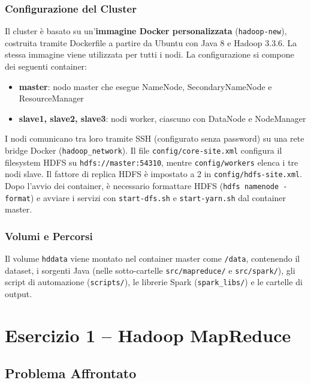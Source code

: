 \documentclass[a4paper, 12pt, oneside]{report}
\begin{document}
\subsection{Configurazione del Cluster}

Il cluster \`e basato su un'\textbf{immagine Docker personalizzata} (\texttt{hadoop-new}), costruita tramite Dockerfile a partire da Ubuntu con Java 8 e Hadoop 3.3.6. La stessa immagine viene utilizzata per tutti i nodi. La configurazione si compone dei seguenti container:

\begin{itemize}
    \item \textbf{master}: nodo master che esegue NameNode, SecondaryNameNode e ResourceManager
    \item \textbf{slave1, slave2, slave3}: nodi worker, ciascuno con DataNode e NodeManager
\end{itemize}

I nodi comunicano tra loro tramite SSH (configurato senza password) su una rete bridge Docker (\texttt{hadoop\_network}). Il file \texttt{config/core-site.xml} configura il filesystem HDFS su \texttt{hdfs://master:54310}, mentre \texttt{config/workers} elenca i tre nodi slave. Il fattore di replica HDFS \`e impostato a 2 in \texttt{config/hdfs-site.xml}. Dopo l'avvio dei container, \`e necessario formattare HDFS (\texttt{hdfs namenode -format}) e avviare i servizi con \texttt{start-dfs.sh} e \texttt{start-yarn.sh} dal container master.

\subsection{Volumi e Percorsi}

Il volume \texttt{hddata} viene montato nel container master come \texttt{/data}, contenendo il dataset, i sorgenti Java (nelle sotto-cartelle \texttt{src/mapreduce/} e \texttt{src/spark/}), gli script di automazione (\texttt{scripts/}), le librerie Spark (\texttt{spark\_libs/}) e le cartelle di output.

\chapter{Esercizio 1 -- Hadoop MapReduce}

\section{Problema Affrontato}
\end{document}
